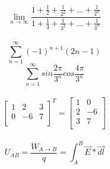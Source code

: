 \documentclass[12pt, letterpaper, titlepage]{article}
\begin{document}
$$\lim_{n\to\infty}\frac{1+\frac{1}{2}+\frac{1}{2^2}+...+\frac{1}{2^n}}{1+\frac{1}{3}+\frac{1}{3^2}+...+\frac{1}{3^n}}$$
\\
$$\sum_{n=1}^\infty (-1)^{n+1}(2n-1)$$
$$\sum_{n=1}^\infty sin\frac{2\pi}{3^n}cos\frac{4\pi}{3^n}$$
\\
$$ 
\left[ \begin{array}{ccc}
1 & 2 & 3 \\
0 & -6 & 7 \\
\end{array} \right] ^T
\mathbf{=}
\left[ \begin{array}{cc}
1 & 0  \\
2 & -6  \\
3 & 7 \\
\end{array} \right] 
$$
\\
$$U_{AB}=\frac{W_{A \to B}}{q}=\int_A^B \vec{E} * \vec{dl}$$
 
\end{document}
